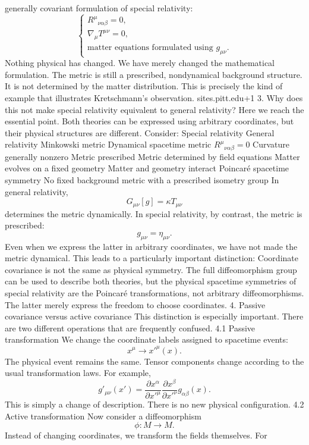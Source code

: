 generally covariant formulation of special relativity: \[ \begin{cases}
    R^\mu{}_{\nu\alpha\beta}=0,\\[2mm] \nabla_\mu T^{\mu\nu}=0,\\[2mm]
\text{matter equations formulated using }g_{\mu\nu}. \end{cases} \] Nothing
physical has changed. We have merely changed the mathematical formulation. The
metric is still a prescribed, nondynamical background structure. It is not
determined by the matter distribution. This is precisely the kind of example
that illustrates Kretschmann's observation. sites.pitt.edu+1 3. Why does this
not make special relativity equivalent to general relativity? Here we reach the
essential point. Both theories can be expressed using arbitrary coordinates,
but their physical structures are different. Consider: Special relativity
General relativity Minkowski metric	Dynamical spacetime metric
\(R^\mu{}_{\nu\alpha\beta}=0\)	Curvature generally nonzero Metric prescribed
Metric determined by field equations Matter evolves on a fixed geometry	Matter
and geometry interact Poincaré spacetime symmetry	No fixed background metric
with a prescribed isometry group In general relativity, \[ G_{\mu\nu}[g]=\kappa
T_{\mu\nu} \] determines the metric dynamically. In special relativity, by
contrast, the metric is prescribed: \[ g_{\mu\nu}=\eta_{\mu\nu}. \] Even when
we express the latter in arbitrary coordinates, we have not made the metric
dynamical. This leads to a particularly important distinction: Coordinate
covariance is not the same as physical symmetry. The full diffeomorphism group
can be used to describe both theories, but the physical spacetime symmetries of
special relativity are the Poincaré transformations, not arbitrary
diffeomorphisms. The latter merely express the freedom to choose coordinates.
4. Passive covariance versus active covariance This distinction is especially
important. There are two different operations that are frequently confused. 4.1
Passive transformation We change the coordinate labels assigned to spacetime
events: \[ x^\mu\longrightarrow x'^\mu(x). \] The physical event remains the
same. Tensor components change according to the usual transformation laws. For
example, \[ g'_{\mu\nu}(x') = \frac{\partial x^\alpha}{\partial x'^\mu}
\frac{\partial x^\beta}{\partial x'^\nu} g_{\alpha\beta}(x). \] This is simply
a change of description. There is no new physical configuration. 4.2 Active
transformation Now consider a diffeomorphism \[ \phi:M\longrightarrow M. \]
Instead of changing coordinates, we transform the fields themselves. For
